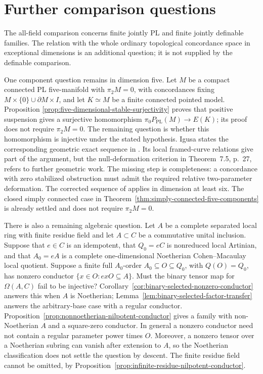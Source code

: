 \documentclass[11pt,a4paper]{article}
\theoremstyle{definition}
\begin{document}
\section{Further comparison questions}
The all-field comparison concerns finite jointly PL and finite jointly
definable families.  The relation with the whole ordinary topological
concordance space in exceptional dimensions is an additional question;
it is not supplied by the definable comparison.

One component question remains in dimension five. Let $M$ be a
compact connected PL five-manifold with $\pi_2M=0$, with concordances
fixing $M\times\{0\}\cup\partial M\times I$, and let $K\simeq M$
be a finite connected pointed model. Proposition
\ref{prop:five-dimensional-stable-surjectivity} proves that
positive suspension gives a surjective homomorphism
$\pi_0P_{\mathrm{PL}}(M)\to E(K)$; its proof does not require
$\pi_2M=0$. The remaining question is whether this homomorphism
is injective under the stated hypothesis.
Igusa states the corresponding geometric exact sequence in
\cite[Theorem~7.1, p.~23]{Igusa2025}. Its local framed-curve
relations give part of the argument, but the null-deformation
criterion in Theorem~7.5, p.~27, refers to further geometric work.
The missing step is completeness: a concordance with zero
stabilized obstruction must admit the required relative
two-parameter deformation. The corrected sequence of
\cite[Theorem~8.a.2, pp.~149--150]{Igusa1984} applies in dimension
at least six. The closed simply connected case in
Theorem~\ref{thm:simply-connected-five-components} is already
settled and does not require $\pi_2M=0$.

There is also a remaining algebraic question.  Let $A$ be a complete
separated local ring with finite residue field and let $A\subset C$
be a commutative unital inclusion.  Suppose that $e\in C$ is an
idempotent, that $Q_0=eC$ is nonreduced local Artinian, and that
$A_0=eA$ is a complete one-dimensional Noetherian Cohen--Macaulay
local quotient.  Suppose a finite full $A_0$-order
$A_0\subseteq O\subseteq Q_0$, with $Q(O)=Q_0$, has nonzero
conductor $\{x\in O:exO\subseteq A\}$.  Must the binary tensor
map for $\Omega(A,C)$ fail to be injective?
Corollary~\ref{cor:binary-selected-nonzero-conductor} answers this
when $A$ is Noetherian; Lemma~\ref{lem:binary-selected-factor-transfer}
answers the arbitrary-base case with a regular conductor.
Proposition~\ref{prop:nonnoetherian-nilpotent-conductor} gives a
family with non-Noetherian $A$ and a square-zero conductor.
In general a nonzero conductor need not contain a regular
parameter power times $O$.  Moreover, a nonzero tensor over a
Noetherian subring can vanish after extension to $A$, so the
Noetherian classification does not settle the question by descent.
The finite residue field cannot be omitted, by
Proposition~\ref{prop:infinite-residue-nilpotent-conductor}.
\end{document}
